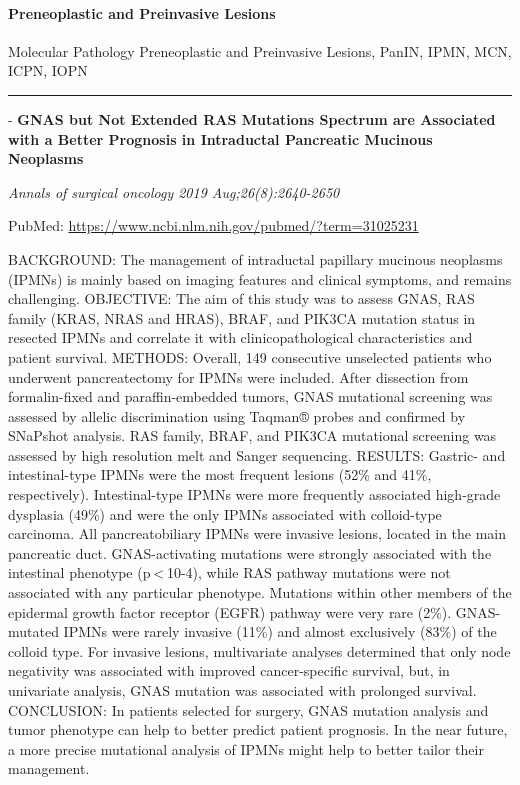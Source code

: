 \documentclass[]{article}
\let\oldparagraph\paragraph
\renewcommand{\paragraph}[1]{\oldparagraph{#1}\mbox{}}
\begin{document}
\hypertarget{preneoplastic-and-preinvasive-lesions-1}{%
\paragraph{Preneoplastic and Preinvasive
Lesions}\label{preneoplastic-and-preinvasive-lesions-1}}

Molecular Pathology Preneoplastic and Preinvasive Lesions, PanIN, IPMN,
MCN, ICPN, IOPN

\begin{center}\rule{0.5\linewidth}{\linethickness}\end{center}

 - \textbf{GNAS but Not Extended RAS Mutations Spectrum are Associated
with a Better Prognosis in Intraductal Pancreatic Mucinous Neoplasms}

\emph{Annals of surgical oncology 2019 Aug;26(8):2640-2650}

PubMed: \url{https://www.ncbi.nlm.nih.gov/pubmed/?term=31025231}

BACKGROUND: The management of intraductal papillary mucinous neoplasms
(IPMNs) is mainly based on imaging features and clinical symptoms, and
remains challenging. OBJECTIVE: The aim of this study was to assess
GNAS, RAS family (KRAS, NRAS and HRAS), BRAF, and PIK3CA mutation status
in resected IPMNs and correlate it with clinicopathological
characteristics and patient survival. METHODS: Overall, 149 consecutive
unselected patients who underwent pancreatectomy for IPMNs were
included. After dissection from formalin-fixed and paraffin-embedded
tumors, GNAS mutational screening was assessed by allelic discrimination
using Taqman® probes and confirmed by SNaPshot analysis. RAS family,
BRAF, and PIK3CA mutational screening was assessed by high resolution
melt and Sanger sequencing. RESULTS: Gastric- and intestinal-type IPMNs
were the most frequent lesions (52\% and 41\%, respectively).
Intestinal-type IPMNs were more frequently associated high-grade
dysplasia (49\%) and were the only IPMNs associated with colloid-type
carcinoma. All pancreatobiliary IPMNs were invasive lesions, located in
the main pancreatic duct. GNAS-activating mutations were strongly
associated with the intestinal phenotype (p \textless{} 10-4), while RAS
pathway mutations were not associated with any particular phenotype.
Mutations within other members of the epidermal growth factor receptor
(EGFR) pathway were very rare (2\%). GNAS-mutated IPMNs were rarely
invasive (11\%) and almost exclusively (83\%) of the colloid type. For
invasive lesions, multivariate analyses determined that only node
negativity was associated with improved cancer-specific survival, but,
in univariate analysis, GNAS mutation was associated with prolonged
survival. CONCLUSION: In patients selected for surgery, GNAS mutation
analysis and tumor phenotype can help to better predict patient
prognosis. In the near future, a more precise mutational analysis of
IPMNs might help to better tailor their management.
\end{document}

